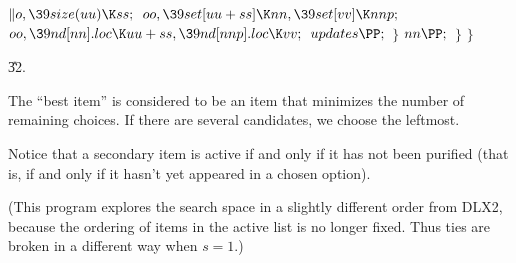 ${}\|o,\39\\{size}(\\{uu})\K\\{ss};{}$\6
${}\\{oo},\39\\{set}[\\{uu}+\\{ss}]\K\\{nn},\39\\{set}[\\{vv}]\K\\{nnp};{}$\6
${}\\{oo},\39\\{nd}[\\{nn}].\\{loc}\K\\{uu}+\\{ss},\39\\{nd}[\\{nnp}].\\{loc}\K%
\\{vv};{}$\6
${}\\{updates}\PP;{}$\6
\4${}\}{}$\2\6
${}\\{nn}\PP;{}$\6
\4${}\}{}$\2\6
\4${}\}{}$\2\par
\U32.\fi

The ``best item'' is considered to be an item that minimizes the
number of remaining choices. If there are several candidates, we
choose the leftmost.

Notice that a secondary item is active if and only if it has not
been purified (that is, if and only if it hasn't yet appeared in
a chosen option).

(This program explores the search space in a slightly different order
from {\mc DLX2}, because the ordering of items in the active list
is no longer fixed. Thus ties are broken in a different way when $s=1$.)

